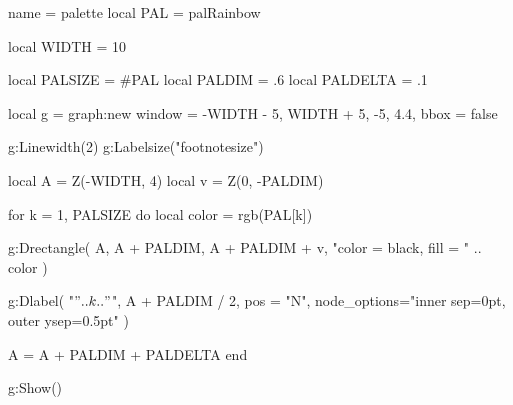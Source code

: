 \documentclass{standalone}
\begin{document}
\begin{luadraw}{name = palette}
local PAL = palRainbow

local WIDTH = 10

local PALSIZE  = #PAL
local PALDIM   = .6
local PALDELTA = .1

local g = graph:new{
  window = {-WIDTH - 5, WIDTH + 5, -5, 4.4},
  bbox   = false
}

g:Linewidth(2)
g:Labelsize("footnotesize")

local A = Z(-WIDTH, 4)
local v = Z(0, -PALDIM)

for k = 1, PALSIZE do
  local color = rgb(PAL[k])

  g:Drectangle(
    A, A + PALDIM, A + PALDIM + v,
    "color = black, fill = " .. color
  )

  g:Dlabel(
    "$" .. k .. "$",
    A + PALDIM / 2,
    {pos = "N", node_options="inner sep=0pt, outer ysep=0.5pt"}
  )

  A = A + PALDIM + PALDELTA
end

g:Show()
\end{luadraw}
\end{document}
